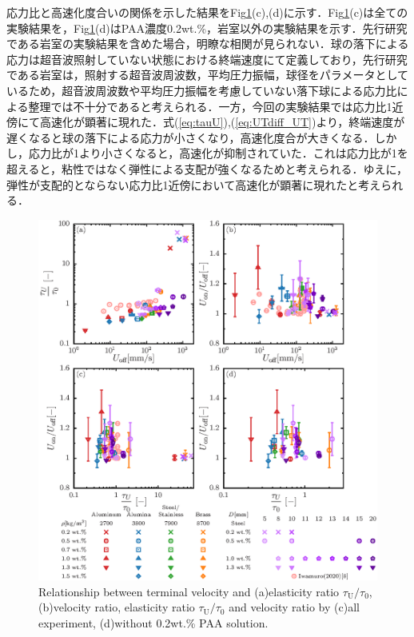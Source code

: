 応力比と高速化度合いの関係を示した結果をFig\ref{fig:elastcity}(c),(d)に示す．Fig\ref{fig:elastcity}(c)は全ての実験結果を，Fig\ref{fig:elastcity}(d)はPAA濃度0.2wt.\%，岩室\cite{ref:8}以外の実験結果を示す．先行研究である岩室\cite{ref:8}の実験結果を含めた場合，明瞭な相関が見られない．球の落下による応力は超音波照射していない状態における終端速度にて定義しており，先行研究である岩室\cite{ref:8}は，照射する超音波周波数，平均圧力振幅，球径をパラメータとしているため，超音波周波数や平均圧力振幅を考慮していない落下球による応力比による整理では不十分であると考えられる．一方，今回の実験結果では応力比1近傍にて高速化が顕著に現れた．式(\ref{eq:tauU}),(\ref{eq:UTdiff_UT})より，終端速度が遅くなると球の落下による応力が小さくなり，高速化度合が大きくなる．しかし，応力比が1より小さくなると，高速化が抑制されていた．これは応力比が1を超えると，粘性ではなく弾性による支配が強くなるためと考えられる．ゆえに，弾性が支配的とならない応力比1近傍において高速化が顕著に現れたと考えられる．

\begin{figure}[H]
    \centering
    \includegraphics[width=1.0\textwidth]{5-Results/elastcity.eps}
    \caption{Relationship between terminal velocity and (a)elasticity ratio $\tau_\text{U}/\tau_\text{0}$, (b)velocity ratio, elasticity ratio $\tau_\text{U}/\tau_\text{0}$ and velocity ratio by (c)all experiment, (d)without 0.2wt.\% PAA solution.}
    \label{fig:elastcity}
\end{figure}

